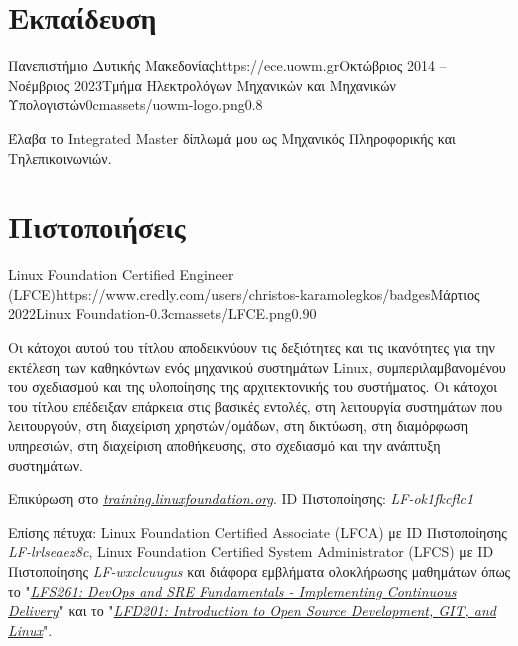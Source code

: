 \documentclass{mycv}
\begin{document}
	\section{Εκπαίδευση}
	\begin{EntryDatedLogo}{Πανεπιστήμιο Δυτικής Μακεδονίας}{https://ece.uowm.gr}{Οκτώβριος 2014 -- Νοέμβριος 2023}{Τμήμα Ηλεκτρολόγων Μηχανικών και Μηχανικών Υπολογιστών}{0cm}{assets/uowm-logo.png}{0.8}
		\vspace{-0.2cm}
		\begin{Itemize}
			\item Έλαβα το Integrated Master δίπλωμά μου ως Μηχανικός Πληροφορικής και Τηλεπικοινωνιών.
		\end{Itemize}
	\end{EntryDatedLogo}

	\section{Πιστοποιήσεις}
    \begin{EntryDatedLogo}{Linux Foundation Certified Engineer (LFCE)}{https://www.credly.com/users/christos-karamolegkos/badges}{Μάρτιος 2022}{Linux Foundation}{-0.3cm}{assets/LFCE.png}{0.90}
    	\vspace{-0.2cm}
		\begin{Itemize}
			\item Οι κάτοχοι αυτού του τίτλου αποδεικνύουν τις δεξιότητες και τις ικανότητες για την εκτέλεση των καθηκόντων ενός μηχανικού συστημάτων Linux, συμπεριλαμβανομένου του σχεδιασμού και της υλοποίησης της αρχιτεκτονικής του συστήματος. Οι κάτοχοι του τίτλου επέδειξαν επάρκεια στις βασικές εντολές, στη λειτουργία συστημάτων που λειτουργούν, στη διαχείριση χρηστών/ομάδων, στη δικτύωση, στη διαμόρφωση υπηρεσιών, στη διαχείριση αποθήκευσης, στο σχεδιασμό και την ανάπτυξη συστημάτων.
			\item Επικύρωση στο \href{https://training.linuxfoundation.org/certification/verify-linux-certifications}{\textit{training.linuxfoundation.org}}. ID Πιστοποίησης: \textit{LF-ok1fkcflc1}
			\item Επίσης πέτυχα: Linux Foundation Certified Associate (LFCA) με ID Πιστοποίησης \textit{LF-lrlseaez8c}, Linux Foundation Certified System Administrator (LFCS) με ID Πιστοποίησης \textit{LF-wxclcuugus} και διάφορα εμβλήματα ολοκλήρωσης μαθημάτων όπως το "\href{https://www.credly.com/badges/19ff66ca-2e10-4e1b-90a9-1c1ac6132878}{\textit{LFS261: DevOps and SRE Fundamentals - Implementing Continuous Delivery}}" και το "\href{https://www.credly.com/badges/1fc7edfc-227e-4e93-ac46-297ab05c27db}{\textit{LFD201: Introduction to Open Source Development, GIT, and Linux}}".
		\end{Itemize}
	\end{EntryDatedLogo}
\end{document}
